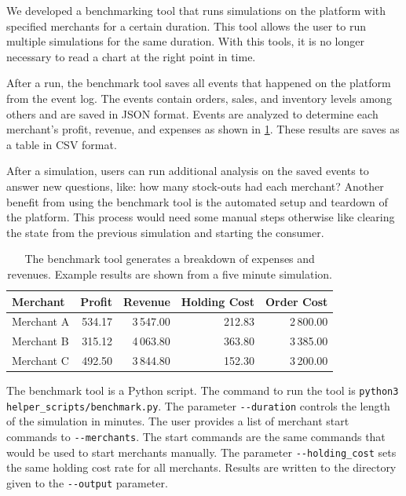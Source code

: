 We developed a benchmarking tool that runs simulations on the \pricewars platform with specified merchants for a certain duration.
This tool allows the user to run multiple simulations for the same duration.
With this tools, it is no longer necessary to read a chart at the right point in time.

After a run, the benchmark tool saves all events that happened on the platform from the event log.
The events contain orders, sales, and inventory levels among others and are saved in JSON format.
Events are analyzed to determine each merchant's profit, revenue, and expenses as shown in \cref{tab:benchmark_tool}.
These results are saves as a table in CSV format.

After a simulation, users can run additional analysis on the saved events to answer new questions, like: how many stock-outs had each merchant?
Another benefit from using the benchmark tool is the automated setup and teardown of the platform.
This process would need some manual steps otherwise like clearing the state from the previous simulation and starting the consumer.

\begin{table}[t]
	\centering
	\begin{tabular}{ lrrrr }
		\toprule
		\textbf{Merchant} & \textbf{Profit} & \textbf{Revenue} & \textbf{Holding Cost} & \textbf{Order Cost} \\
		\midrule
		Merchant A & 534.17 & 3\,547.00 & 212.83 & 2\,800.00 \\
		Merchant B & 315.12 & 4\,063.80 & 363.80 & 3\,385.00 \\
		Merchant C & 492.50 & 3\,844.80 & 152.30 & 3\,200.00 \\
		\bottomrule
	\end{tabular}
	\caption[Benchmark Tool: Breakdown of Expenses and Revenues]{The benchmark tool generates a breakdown of expenses and revenues. Example results are shown from a five minute simulation.}
	\label{tab:benchmark_tool}
\end{table}

The benchmark tool is a Python script.
The command to run the tool is \texttt{python3 helper\_scripts/benchmark.py}.
The parameter \texttt{-{}-duration} controls the length of the simulation in minutes.
The user provides a list of merchant start commands to \texttt{-{}-merchants}.
The start commands are the same commands that would be used to start merchants manually.
The parameter \texttt{-{}-holding\_cost} sets the same holding cost rate for all merchants. 
Results are written to the directory given to the \texttt{-{}-output} parameter.

